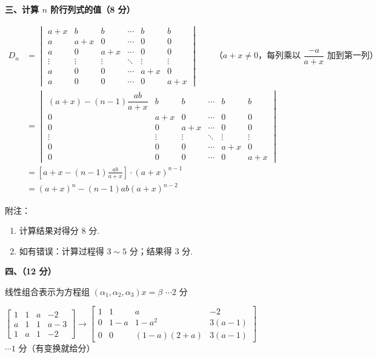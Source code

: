\documentclass[a4paper,11pt]{ctexart}
\newcommand{\score}[1]{\hfill$\cdots\text{#1 分}$}
\begin{document}
\vspace{0.9em}

\textbf{三、计算 $n$ 阶行列式的值（8 分）}

\begin{align*}
  D_n &= \begin{vmatrix}
    a+x & b & b & \cdots & b & b \\
    a & a+x & 0 & \cdots & 0 & 0 \\
    a & 0 & a+x & \cdots & 0 & 0 \\
    \vdots & \vdots & \vdots & \ddots & \vdots & \vdots \\
    a & 0 & 0 & \cdots & a+x & 0 \\
    a & 0 & 0 & \cdots & 0 & a+x
  \end{vmatrix} \qquad \text{（}a+x \neq 0\text{，每列乘以 }\dfrac{-a}{a+x}\text{ 加到第一列）} \\[0.6em]
  &= \begin{vmatrix}
    (a+x) - (n-1)\dfrac{ab}{a+x} & b & b & \cdots & b & b \\
    0 & a+x & 0 & \cdots & 0 & 0 \\
    0 & 0 & a+x & \cdots & 0 & 0 \\
    \vdots & \vdots & \vdots & \ddots & \vdots & \vdots \\
    0 & 0 & 0 & \cdots & a+x & 0 \\
    0 & 0 & 0 & \cdots & 0 & a+x
  \end{vmatrix} \\[0.6em]
  &= \left[a + x - (n-1)\frac{ab}{a+x}\right]\cdot (a+x)^{n-1} \\
  &= (a+x)^n - (n-1)ab(a+x)^{n-2}
\end{align*}

附注：\par\nopagebreak
\begin{enumerate}[label=\arabic*., leftmargin=2em, itemsep=0.15em, topsep=0.2em]
  \item 计算结果对得分 $8$ 分.
  \item 如有错误：计算过程得 $3\sim 5$ 分；结果得 $3$ 分.
\end{enumerate}

\vspace{0.9em}

\textbf{四、（12 分）}

线性组合表示为方程组 $(\alpha_1, \alpha_2, \alpha_3)x = \beta$ \score{2}

$\begin{bmatrix} 1 & 1 & a & -2 \\ a & 1 & 1 & a-3 \\ 1 & a & 1 & -2 \end{bmatrix} \to \begin{bmatrix} 1 & 1 & a & -2 \\ 0 & 1-a & 1-a^2 & 3(a-1) \\ 0 & 0 & (1-a)(2+a) & 3(a-1) \end{bmatrix}$ \hfill $\cdots\text{1 分（有变换就给分）}$
\end{document}
